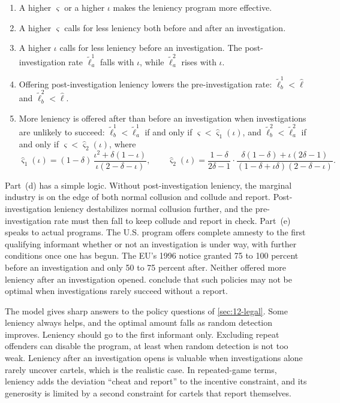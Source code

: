 \begin{proposition}\label{prop:12-cr-statics}
\leavevmode
\begin{enumerate}[label=(\alph*)]
\item A higher $\varsigma$ or a higher $\iota$ makes the leniency program more effective.
\item A higher $\varsigma$ calls for less leniency both before and after an investigation.
\item A higher $\iota$ calls for less leniency before an investigation. The post-investigation rate $\tilde\ell_a^1$
falls with $\iota$, while $\tilde\ell_a^2$ rises with $\iota$.
\item Offering post-investigation leniency lowers the pre-investigation rate: $\tilde\ell_b^1 < \hat\ell$ and
$\tilde\ell_b^2 < \hat\ell$.
\item More leniency is offered after than before an investigation when investigations are unlikely to succeed:
$\tilde\ell_b^1 < \tilde\ell_a^1$ if and only if $\varsigma < \hat\varsigma_1(\iota)$, and $\tilde\ell_b^2 <
\tilde\ell_a^2$ if and only if $\varsigma < \hat\varsigma_2(\iota)$, where
\begin{equation*}
\hat\varsigma_1(\iota) = (1-\delta)\,\frac{\iota^2 + \delta(1-\iota)}{\iota(2 - \delta - \iota)},\qquad
\hat\varsigma_2(\iota) = \frac{1-\delta}{2\delta - 1}\cdot\frac{\delta(1-\delta) + \iota(2\delta - 1)}{(1 - \delta + \iota\delta)(2 - \delta - \iota)}.
\end{equation*}
\end{enumerate}
\end{proposition}

Part~(d) has a simple logic. Without post-investigation leniency, the marginal industry is on the edge of both normal
collusion and collude and report. Post-investigation leniency destabilizes normal collusion further, and the
pre-investigation rate must then fall to keep collude and report in check. Part~(e) speaks to actual programs. The U.S.
program offers complete amnesty to the first qualifying informant whether or not an investigation is under way, with
further conditions once one has begun. The EU's 1996 notice granted 75 to 100 percent before an investigation and only
50 to 75 percent after. Neither offered more leniency after an investigation opened. \citet[p.~29]{ChenRey2013} conclude that such policies may not be optimal when investigations
rarely succeed without a report.

The model gives sharp answers to the policy questions of \cref{sec:12-legal}. Some leniency always helps, and the
optimal amount falls as random detection improves. Leniency should go to the first informant only. Excluding repeat
offenders can disable the program, at least when random detection is not too weak. Leniency after an investigation opens is valuable when investigations alone rarely
uncover cartels, which is the realistic case. In repeated-game terms, leniency adds the deviation ``cheat and
report'' to the incentive constraint, and its generosity is limited by a second constraint for cartels that report
themselves.

